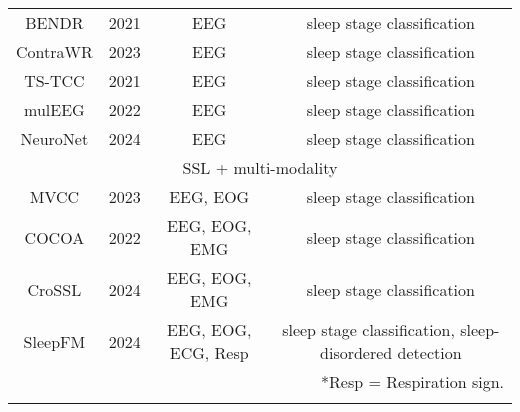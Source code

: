 \begin{table*}[t]
{{\begin{tabular}{c|c|c|c}
\hline
BENDR \cite{ref15}           & 2021          & EEG                 & sleep stage classification                              \\
ContraWR \cite{ref16}        & 2023          & EEG                 & sleep stage classification                              \\
TS-TCC \cite{ref17}          & 2021          & EEG                 & sleep stage classification                              \\
mulEEG \cite{ref18}          & 2022          & EEG                 & sleep stage classification                              \\
NeuroNet \cite{ref19}        & 2024          & EEG                 & sleep stage classification                              \\ 
\hline
\multicolumn{4}{c}{SSL + multi-modality}                                                                             \\ 
\hline
MVCC \cite{ref20}            & 2023          & EEG, EOG            & sleep stage classification                              \\
COCOA \cite{ref21}           & 2022          & EEG, EOG, EMG       & sleep stage classification                              \\
CroSSL \cite{ref22}          & 2024          & EEG, EOG, EMG       & sleep stage classification                              \\
SleepFM \cite{ref23}         & 2024          & EEG, EOG, ECG, Resp & sleep stage classification, sleep-disordered detection  \\ 
\hline
\multicolumn{4}{r}{*Resp = Respiration sign.}  \\     
\multicolumn{4}{r}{}

\end{tabular}}
}
\vspace{-9mm}
\end{table*}